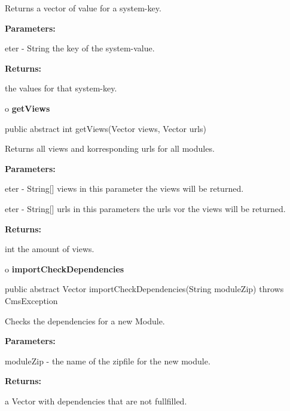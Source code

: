 \begin{description}
\htmlDD Returns a vector of value for a system-key. 

\begin{description}
\item {\bf Parameters:}  

eter - String the key of the system-value.  
\item {\bf Returns:}  

the values for that system-key.  
\end{description}

\end{description}

o {\bf getViews} 

\begin{PRE}
 public abstract int getViews(Vector views,
                              Vector urls)
\end{PRE}

\begin{description}
\htmlDD Returns all views and korresponding urls for all modules. 

\begin{description}
\item {\bf Parameters:}  

eter - String[] views in this parameter the views will be returned.  

eter - String[] urls in this parameters the urls vor the views will be
returned.  
\item {\bf Returns:}  

int the amount of views.  
\end{description}

\end{description}

o {\bf importCheckDependencies} 

\begin{PRE}
 public abstract Vector importCheckDependencies(String moduleZip) throws CmsException
\end{PRE}

\begin{description}
\htmlDD Checks the dependencies for a new Module. 

\begin{description}
\item {\bf Parameters:}  

moduleZip - the name of the zipfile for the new module.  
\item {\bf Returns:}  

a Vector with dependencies that are not fullfilled.  
\end{description}

\end{description}

